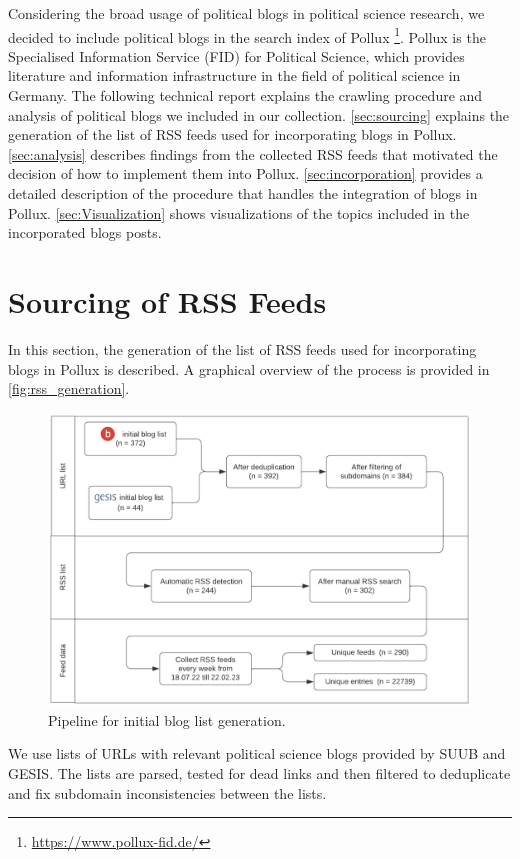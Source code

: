\documentclass{article}
\newcommand{\Autoref}[1]{%
  \begingroup%
  \def\chapterautorefname{Chapter}%
  \def\sectionautorefname{Section}%
  \def\subsectionautorefname{Subsection}%
  \autoref{#1}%
  \endgroup%
}
\begin{document}
Considering the broad usage of political blogs in political science research, we decided to include political blogs in the search index of Pollux \footnote{\url{https://www.pollux-fid.de/}}. Pollux is the Specialised Information Service (FID) for Political Science, which provides literature and information infrastructure in the field of political science in Germany. The following technical report explains the crawling procedure and analysis of political blogs we included in our collection. \Autoref{sec:sourcing} explains the generation of the list of RSS feeds used for incorporating blogs in Pollux. \Autoref{sec:analysis} describes findings from the collected RSS feeds that motivated the decision of how to implement them into Pollux. \Autoref{sec:incorporation} provides a detailed description of the procedure that handles the integration of blogs in Pollux. \Autoref{sec:Visualization} shows visualizations of the topics included in the incorporated blogs posts.

\section{Sourcing of RSS Feeds}\label{sec:sourcing}
In this section, the generation of the list of RSS feeds used for incorporating blogs in Pollux is described. A graphical overview of the process is provided in \autoref{fig:rss_generation}.

\begin{figure}[htb]
    \centering
    \includegraphics[width=.7\textwidth]{figures/generation_of_initial_list.png}
    \caption{Pipeline for initial blog list generation.}
    \label{fig:rss_generation}
\end{figure}

We use lists of URLs with relevant political science blogs provided by SUUB and GESIS. The lists are parsed, tested for dead links and then filtered to deduplicate and fix subdomain inconsistencies between the lists.
\end{document}
